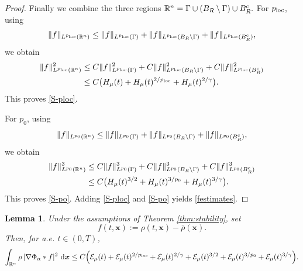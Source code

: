 \documentclass[reqno,11pt]{amsart}
\numberwithin{equation}{section}
\newtheorem{lemma}[theorem]{Lemma}
\theoremstyle{definition}
\def\dd{{\, \rm d}}
\begin{document}
\begin{proof}
Finally we combine the three regions $\mathbb R^n =\Gamma\cup(B_R\setminus \Gamma)\cup B_R^{\rm c}.$
For $p_{\rm loc}$, using
\[  \|f\|_{L^{p_{\rm loc}}(\mathbb R^n)}  \le  \|f\|_{L^{p_{\rm loc}}(\Gamma)} +   \|f\|_{L^{p_{\rm loc}}(B_R\setminus \Gamma)} + \|f\|_{L^{p_{\rm loc}}(B_R^{\rm c})},
\]
we obtain
\[
\begin{aligned}
  \|f\|_{L^{p_{\rm loc}}(\mathbb R^n)}^2
   &\le
  C\|f\|_{L^{p_{\rm loc}}(\Gamma)}^2
  +
  C\|f\|_{L^{p_{\rm loc}}(B_R\setminus \Gamma)}^2
  +
   C\|f\|_{L^{p_{\rm loc}}(B_R^{\rm c})}^2        \\
 &\le C\big( H_\mu(t)+H_\mu(t)^{2/p_{\rm loc}}
+H_\mu(t)^{2/\gamma}\big).
\end{aligned}
\]
This proves \eqref{S-ploc}.

For $p_0$, using
\[
 \|f\|_{L^{p_0}(\mathbb R^n)}
\le \|f\|_{L^{p_0}(\Gamma)} +  \|f\|_{L^{p_0}(B_R\setminus \Gamma)}  +   \|f\|_{L^{p_0}(B_R^{\rm c})},
\]
we obtain
\[
\begin{aligned}
  \|f\|_{L^{p_0}(\mathbb R^n)}^3
 &\le  C\|f\|_{L^{p_0}(\Gamma)}^3  +
   C\|f\|_{L^{p_0}(B_R\setminus \Gamma)}^3 + C\|f\|_{L^{p_0}(B_R^{\rm c})}^3               \\
 &\le C\big( H_\mu(t)^{3/2}
 + H_\mu(t)^{3/p_0} +H_\mu(t)^{3/\gamma}  \big).
\end{aligned}
\]
This proves \eqref{S-po}.  Adding
\eqref{S-ploc} and \eqref{S-po} yields
\eqref{festimates}.
\end{proof}


\begin{lemma}\label{relativenonlocal}
Under the assumptions of {\rm Theorem \ref{thm:stability}}, set
\[
f(t,\boldsymbol{x}):=\rho(t,\boldsymbol{x})-\bar\rho(\boldsymbol{x}).
\]
Then, for {\it a.e.} $t\in(0,T)$,
\begin{equation}\label{relativeestimate}
\int_{\mathbb R^n}\rho\,|\nabla\Phi_\alpha*f|^2\,\dd\boldsymbol{x}
 \le C\Big( \mathcal E_\mu(t) +\mathcal E_\mu(t)^{2/p_{\rm loc}} +\mathcal E_\mu(t)^{2/\gamma} +\mathcal E_\mu(t)^{3/2}+\mathcal E_\mu(t)^{3/p_0}  +\mathcal E_\mu(t)^{3/\gamma}  \Big).
\end{equation}
\end{lemma}
\end{document}
